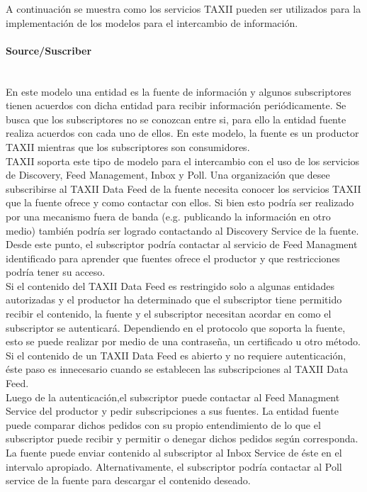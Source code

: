 A continuación se muestra como los servicios TAXII pueden ser utilizados para la 
implementación de los modelos para el intercambio de información.

\paragraph{Source/Suscriber}\ \\

En este modelo una entidad es la fuente de información y algunos subscriptores 
tienen acuerdos con dicha entidad para recibir información periódicamente. Se 
busca que los subscriptores no se conozcan entre si, para ello la entidad fuente 
realiza acuerdos con cada uno de ellos. En este modelo, la fuente es 
un productor TAXII mientras que los subscriptores son consumidores.\\

TAXII soporta este tipo de modelo para el intercambio con el uso de los servicios de 
Discovery, Feed Management, Inbox y Poll. Una organización que desee 
subscribirse al TAXII Data Feed de la fuente necesita conocer los servicios 
TAXII que la fuente ofrece y como contactar con ellos. Si bien esto podría ser 
realizado por una mecanismo fuera de banda (e.g. publicando la información en otro medio)
también podría ser logrado contactando al Discovery Service de la fuente. Desde 
este punto, el subscriptor podría contactar al servicio de Feed Managment 
identificado para aprender que fuentes ofrece el productor y que restricciones 
podría tener su acceso.\\

Si el contenido del TAXII Data Feed es restringido solo a algunas entidades 
autorizadas y el productor ha determinado que el subscriptor tiene permitido 
recibir el contenido, la fuente y el subscriptor necesitan acordar en como el 
subscriptor se autenticará. Dependiendo en el protocolo que soporta la fuente, 
esto se puede realizar por medio de una contraseña, un certificado u otro método. 
Si el contenido de un TAXII Data Feed es abierto y no requiere 
autenticación, éste paso es innecesario cuando se establecen las subscripciones 
al TAXII Data Feed.\\

Luego de la autenticación,el subscriptor puede contactar al Feed Managment Service del 
productor y pedir subscripciones a sus fuentes. La entidad fuente puede 
comparar dichos pedidos con su propio entendimiento de lo que el subscriptor 
puede recibir y permitir o denegar dichos pedidos según corresponda. La fuente 
puede enviar contenido al subscriptor al Inbox Service de éste en el intervalo 
apropiado. Alternativamente, el subscriptor podría contactar al Poll service de 
la fuente para descargar el contenido deseado.\\

